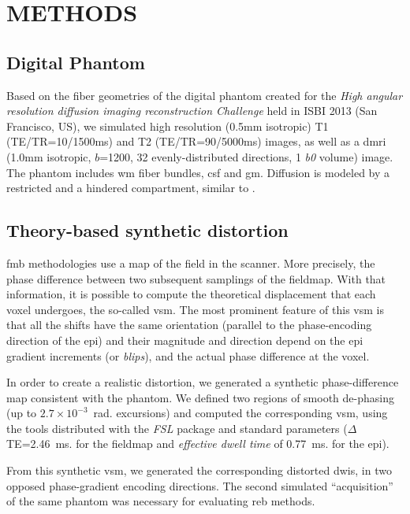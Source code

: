 \section{METHODS}

\subsection{Digital Phantom}
Based on the fiber geometries of the digital phantom 
created for the \emph{High angular resolution diffusion imaging 
reconstruction Challenge} held in ISBI 2013 
(San Francisco, US), we simulated high resolution 
(0.5mm isotropic) T1 (TE/TR=10/1500ms) and T2 
(TE/TR=90/5000ms) images, as well as a \gls*{dmri}
(1.0mm isotropic, $b$=1200, 32 evenly-distributed 
directions, 1 \textit{b0} volume) image.
The phantom includes \gls*{wm} fiber bundles, 
\gls*{csf} and \gls*{gm}. Diffusion is modeled by a 
restricted and a hindered compartment, similar to
\cite{assaf_composite_2005}.

\subsection{Theory-based synthetic distortion}
\label{sec:distortion}
\Gls*{fmb} methodologies use a map
of the field in the scanner. More precisely, the
phase difference between two subsequent samplings
of the fieldmap. With that information, it is possible
to compute the theoretical displacement that each
voxel undergoes, the so-called \gls*{vsm}. The
most prominent feature of this \gls*{vsm} is that all
the shifts have the same orientation (parallel to the
phase-encoding direction of the \gls*{epi}) and their
magnitude and direction depend on the \gls*{epi} 
gradient increments (or \emph{blips}), and the actual
phase difference at the voxel.

In order to create a realistic distortion, we
generated a synthetic phase-difference map 
consistent with the phantom.  We defined two regions 
of smooth de-phasing (up to $2.7\times10^{-3}$~rad. excursions) 
and computed the corresponding \gls*{vsm}, using the 
tools distributed with the \emph{FSL} package 
\cite{jenkinson_fsl_2012}  and
standard parameters ($\Delta$TE=2.46~ms. for the
fieldmap and \emph{effective dwell time} of 
0.77~ms. for the \gls*{epi}).

From this synthetic \gls*{vsm},
we generated
the corresponding distorted \glspl*{dwi}, in two opposed
phase-gradient encoding directions. The second simulated
``acquisition'' of the same phantom was necessary 
for evaluating \gls*{reb} methods.

